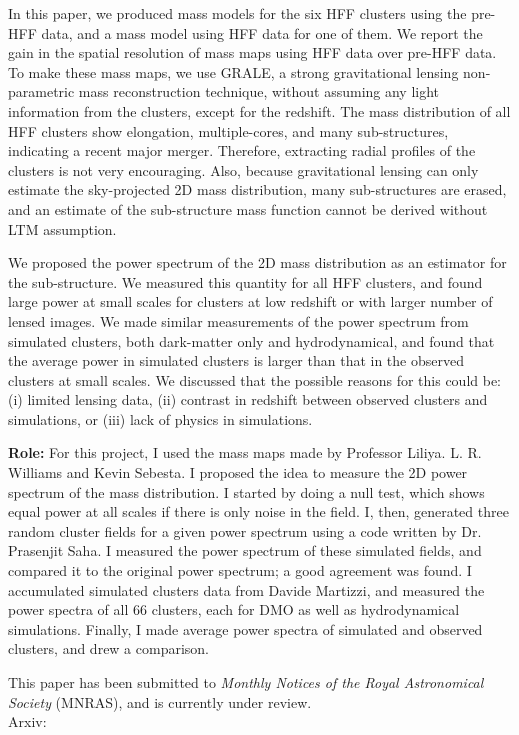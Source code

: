 In this paper, we produced mass models for the six HFF clusters using the pre-HFF
data, and a mass model using HFF data for one of them. We report the gain in the
spatial resolution of mass maps using HFF data over pre-HFF data. To make
these mass maps, we use GRALE, a strong gravitational lensing non-parametric 
mass reconstruction technique, without assuming any light information from
the clusters, except for the redshift. The mass distribution of all HFF
clusters show elongation, multiple-cores, and many sub-structures, 
indicating a recent major merger. Therefore, extracting radial profiles
of the clusters is not very encouraging. Also, because gravitational lensing
can only estimate the sky-projected 2D mass distribution, many sub-structures
are erased, and an estimate of the sub-structure mass function
cannot be derived without LTM assumption. 

We proposed the power spectrum of the 2D mass distribution as an estimator
for the sub-structure. We measured this quantity for all HFF clusters, and 
found large power at small scales for clusters at low redshift or with
larger number of lensed images. We made similar measurements of the
power spectrum from simulated clusters, both dark-matter only and 
hydrodynamical, and
found that the average power in simulated clusters is larger than that
in the observed clusters at small scales. We discussed that the possible reasons
for this could be: (i) limited lensing data, (ii) contrast in redshift between
observed clusters and simulations, or (iii) lack of physics in simulations.


{\bf Role:} For this project, I used the mass maps made by Professor
Liliya. L. R. Williams and Kevin Sebesta. 
I proposed the idea to measure the 2D power spectrum
of the mass distribution. I started
by doing a null test, which shows equal power at all scales if there is
only noise in the field. I, then, generated three random cluster fields 
for a given power spectrum using a code written by Dr. Prasenjit Saha. I 
measured the power spectrum of these simulated fields, and compared it to 
the original power spectrum; a good agreement was found. I accumulated 
simulated clusters data from Davide Martizzi, and measured the power spectra
of all 66 clusters, each for DMO as well as hydrodynamical simulations. Finally, 
I made average power spectra of simulated and observed clusters, and
drew a comparison.









This paper has been submitted to {\it Monthly Notices of the Royal Astronomical
Society} (MNRAS), and is currently under review.
\\
Arxiv: \url{}

\clearpage
